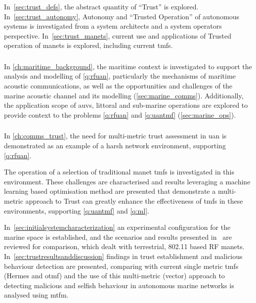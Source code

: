 In~\autoref{sec:trust_defs}, the abstract quantity of ``Trust'' is explored.
In~\autoref{sec:trust_autonomy}, Autonomy and ``Trusted Operation'' of autonomous systems is investigated from a system architects and a system operators perspective.
In~\autoref{sec:trust_manets}, current use and applications of Trusted operation of \glspl{manet} is explored, including current \glspl{tmf}.

\subsubsection{}
In \autoref{ch:maritime_background}, the maritime context is investigated to support the analysis and modelling of \ref{q:rfuan}, particularly the mechanisms of maritime acoustic communications, as well as the opportunities and challenges of the marine acoustic channel and its modelling (\autoref{sec:marine_comms}).
Additionally, the application scope of \glspl{auv}, littoral and sub-marine operations are explored to provide context to the problems \autoref{q:rfuan} and \autoref{q:uantmf} (\autoref{sec:marine_ops}).

\subsubsection{}
In \autoref{ch:comms_trust}, the need for multi-metric trust assessment in \gls{uan} is demonstrated as an example of a harsh network environment, supporting \ref{q:rfuan}.

The operation of a selection of traditional \gls{manet} \glspl{tmf} is investigated in this environment.
These challenges are characterised and results leveraging a machine learning based optimisation method are presented that demonstrate a multi-metric approach to Trust can greatly enhance the effectiveness of \glspl{tmf} in these environments, supporting \autoref{q:uantmf} and \autoref{q:ml}.

In~\autoref{sec:initialsystemcharacterization} an experimental configuration for the marine space is established, and the scenarios and results presented in~\citet{Guo11} are reviewed for comparison, which dealt with terrestrial, 802.11 based RF \glspl{manet}.
In~\autoref{sec:trustresultsanddiscussion} findings in trust establishment and malicious behaviour detection are presented, comparing with current single metric \glspl{tmf} (Hermes and \gls{otmf}) and the use of this multi-metric (vector) approach to detecting malicious and selfish behaviour in autonomous marine networks is analysed using \gls{mtfm}.

